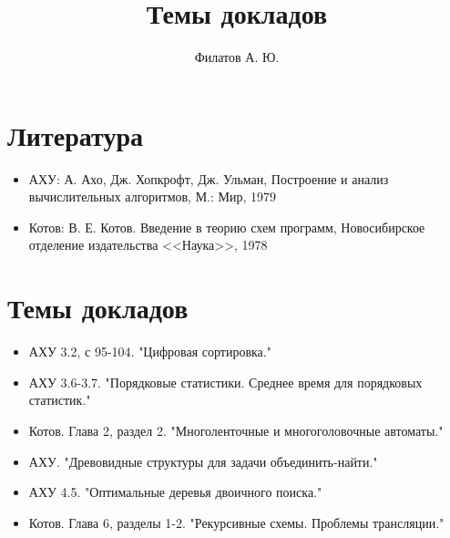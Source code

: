 \documentclass[a4paper, 12pt]{extarticle}
\title{Темы докладов}
\author{Филатов А. Ю.}
\date{}
\begin{document}
\section*{Литература}

\begin{itemize}
 \item АХУ: А. Ахо, Дж. Хопкрофт, Дж. Ульман, Построение и анализ вычислительных алгоритмов, М.: Мир, 1979
 \item Котов: В. Е. Котов. Введение в теорию схем программ,  Новосибирское отделение издательства <<Наука>>, 1978
\end{itemize}


\section*{Темы докладов}

\begin{itemize}
 \item АХУ 3.2, с 95-104. "Цифровая сортировка."
 \item АХУ 3.6-3.7. "Порядковые статистики. Среднее время для порядковых статистик." 
 
 \item Котов. Глава 2, раздел 2. "Многоленточные и многоголовочные автоматы."
 \item АХУ. "Древовидные структуры для задачи объединить-найти."
 
 \item АХУ 4.5. "Оптимальные деревья двоичного поиска."
 \item Котов. Глава 6, разделы 1-2. "Рекурсивные схемы. Проблемы трансляции."
\end{itemize}

\thispagestyle{empty}
\end{document}
